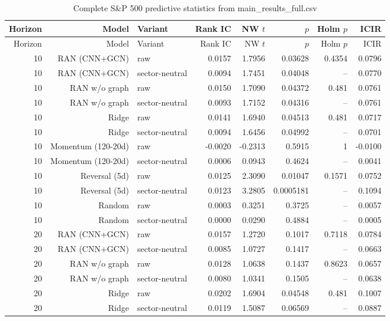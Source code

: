 \documentclass[10pt]{article}
\begin{document}
\begingroup\scriptsize\setlength{\tabcolsep}{2.5pt}
\begin{longtable}{rrlrrrrr}
\caption{Complete S\&P 500 predictive statistics from main\_results\_full.csv}\label{tab:sp500pred}\\
\toprule
Horizon & Model & Variant & Rank IC & NW $t$ & $p$ & Holm $p$ & ICIR \\
\midrule
\endfirsthead
\toprule
Horizon & Model & Variant & Rank IC & NW $t$ & $p$ & Holm $p$ & ICIR \\
\midrule
\endhead
10 & RAN (CNN+GCN) & raw & 0.0157 & 1.7956 & 0.03628 & 0.4354 & 0.0796 \\
10 & RAN (CNN+GCN) & sector-neutral & 0.0094 & 1.7451 & 0.04048 & -- & 0.0770 \\
10 & RAN w/o graph & raw & 0.0150 & 1.7090 & 0.04372 & 0.481 & 0.0761 \\
10 & RAN w/o graph & sector-neutral & 0.0093 & 1.7152 & 0.04316 & -- & 0.0761 \\
10 & Ridge & raw & 0.0141 & 1.6940 & 0.04513 & 0.481 & 0.0717 \\
10 & Ridge & sector-neutral & 0.0094 & 1.6456 & 0.04992 & -- & 0.0701 \\
10 & Momentum (120-20d) & raw & -0.0020 & -0.2313 & 0.5915 & 1 & -0.0100 \\
10 & Momentum (120-20d) & sector-neutral & 0.0006 & 0.0943 & 0.4624 & -- & 0.0041 \\
10 & Reversal (5d) & raw & 0.0125 & 2.3090 & 0.01047 & 0.1571 & 0.0752 \\
10 & Reversal (5d) & sector-neutral & 0.0123 & 3.2805 & 0.0005181 & -- & 0.1094 \\
10 & Random & raw & 0.0003 & 0.3251 & 0.3725 & -- & 0.0057 \\
10 & Random & sector-neutral & 0.0000 & 0.0290 & 0.4884 & -- & 0.0005 \\
20 & RAN (CNN+GCN) & raw & 0.0157 & 1.2720 & 0.1017 & 0.7118 & 0.0784 \\
20 & RAN (CNN+GCN) & sector-neutral & 0.0085 & 1.0727 & 0.1417 & -- & 0.0663 \\
20 & RAN w/o graph & raw & 0.0128 & 1.0638 & 0.1437 & 0.8623 & 0.0657 \\
20 & RAN w/o graph & sector-neutral & 0.0080 & 1.0341 & 0.1505 & -- & 0.0638 \\
20 & Ridge & raw & 0.0202 & 1.6904 & 0.04548 & 0.481 & 0.1007 \\
20 & Ridge & sector-neutral & 0.0119 & 1.5087 & 0.06569 & -- & 0.0887 \\

\end{longtable}
\end{document}
